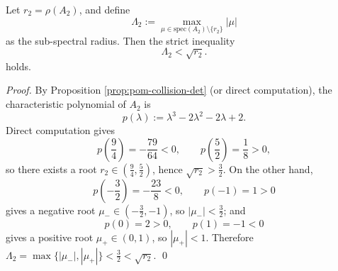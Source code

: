 \begin{proposition}\label{prop:pom-a2-strict-rh-certificate}
Let \(r_2=\rho(A_2)\), and define
\[
\Lambda_2:=\max_{\mu\in\mathrm{spec}(A_2)\setminus\{r_2\}}|\mu|
\]
as the sub-spectral radius. Then the strict inequality
\[
\boxed{\;\Lambda_2<\sqrt{r_2}.\;}
\]
holds.
\end{proposition}
\begin{proof}
By Proposition \ref{prop:pom-collision-det} (or direct computation), the characteristic polynomial of \(A_2\) is
\[
p(\lambda):=\lambda^3-2\lambda^2-2\lambda+2.
\]
Direct computation gives
\[
p\!\left(\frac94\right)=-\frac{79}{64}<0,\qquad
p\!\left(\frac52\right)=\frac18>0,
\]
so there exists a root \(r_2\in\left(\frac94,\frac52\right)\), hence \(\sqrt{r_2}>\frac32\).
On the other hand,
\[
p\!\left(-\frac32\right)=-\frac{23}{8}<0,\qquad p(-1)=1>0
\]
gives a negative root \(\mu_-\in\left(-\frac32,-1\right)\), so \(|\mu_-|<\frac32\); and
\[
p(0)=2>0,\qquad p(1)=-1<0
\]
gives a positive root \(\mu_+\in(0,1)\), so \(|\mu_+|<1\).
Therefore \(\Lambda_2=\max\{|\mu_-|,|\mu_+|\}<\frac32<\sqrt{r_2}\). \qed
\end{proof}

